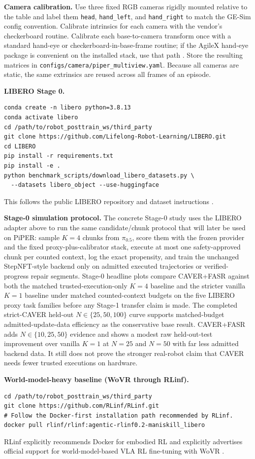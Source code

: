 \documentclass[10pt]{article}
\theoremstyle{plain}
\theoremstyle{definition}
\theoremstyle{remark}
\begin{document}
\textbf{Camera calibration.}
Use three fixed RGB cameras rigidly mounted relative to the table and label them \texttt{head}, \texttt{hand\_left}, and \texttt{hand\_right} to match the GE-Sim config convention. Calibrate intrinsics for each camera with the vendor's checkerboard routine. Calibrate each base-to-camera transform once with a standard hand-eye or checkerboard-in-base-frame routine; if the AgileX hand-eye package is convenient on the installed stack, use that path \citep{agilex2026handeye}. Store the resulting matrices in \texttt{configs/camera/piper\_multiview.yaml}. Because all cameras are static, the same extrinsics are reused across all frames of an episode.

\textbf{LIBERO Stage 0.}
\begin{lstlisting}
conda create -n libero python=3.8.13
conda activate libero
cd /path/to/robot_posttrain_ws/third_party
git clone https://github.com/Lifelong-Robot-Learning/LIBERO.git
cd LIBERO
pip install -r requirements.txt
pip install -e .
python benchmark_scripts/download_libero_datasets.py \
  --datasets libero_object --use-huggingface
\end{lstlisting}
This follows the public LIBERO repository and dataset instructions \citep{libero2023benchmark,liberorepo2026}.

\textbf{Stage-0 simulation protocol.}
The concrete Stage-0 study uses the LIBERO adapter above to run the same candidate/chunk protocol that will later be used on PiPER: sample $K=4$ chunks from $\pi_{0.5}$, score them with the frozen provider and the fixed proxy-plus-calibrator stack, execute at most one safety-approved chunk per counted context, log the exact propensity, and train the unchanged StepNFT-style backend only on admitted executed trajectories or verified-progress repair segments. Stage-0 headline plots compare CAVER+FASR against both the matched trusted-execution-only $K=4$ baseline and the stricter vanilla $K=1$ baseline under matched counted-context budgets on the five LIBERO proxy task families before any Stage-1 transfer claim is made. The completed strict-CAVER held-out $N\in\{25,50,100\}$ curve supports matched-budget admitted-update-data efficiency as the conservative base result. CAVER+FASR adds $N\in\{10,25,50\}$ evidence and shows a modest raw held-out-test improvement over vanilla $K=1$ at $N=25$ and $N=50$ with far less admitted backend data. It still does not prove the stronger real-robot claim that CAVER needs fewer trusted executions on hardware.

\textbf{World-model-heavy baseline (WoVR through RLinf).}
\begin{lstlisting}
cd /path/to/robot_posttrain_ws/third_party
git clone https://github.com/RLinf/RLinf.git
# Follow the Docker-first installation path recommended by RLinf.
docker pull rlinf/rlinf:agentic-rlinf0.2-maniskill_libero
\end{lstlisting}
RLinf explicitly recommends Docker for embodied RL and explicitly advertises official support for world-model-based VLA RL fine-tuning with WoVR \citep{rlinfrepo2026}.
\end{document}
